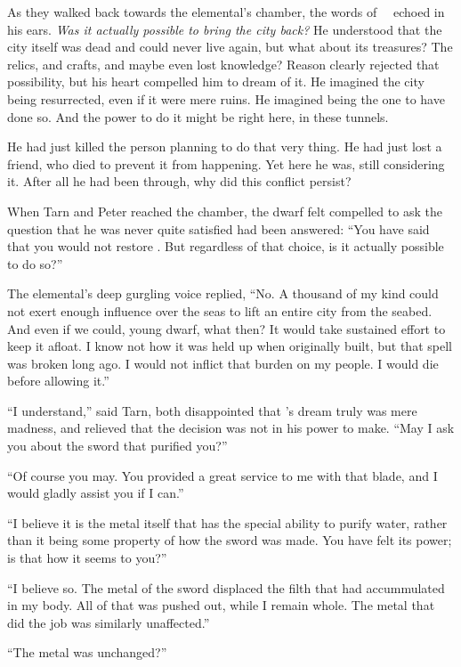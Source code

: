 As they walked back towards the elemental's chamber, the words of \mothzam\ \driktur\ echoed in his ears.  \emph{Was it actually possible to bring the city back?}  He understood that the city itself was dead and could never live again, but what about its treasures?  The relics, and crafts, and maybe even lost knowledge?  Reason clearly rejected that possibility, but his heart compelled him to dream of it.  He imagined the city being resurrected, even if it were mere ruins.  He imagined being the one to have done so.  And the power to do it might be right here, in these tunnels.

He had just killed the person planning to do that very thing.  He had just lost a friend, who died to prevent it from happening.  Yet here he was, still considering it.  After all he had been through, why did this conflict persist?

When Tarn and Peter reached the chamber, the dwarf felt compelled to ask the question that he was never quite satisfied had been answered: ``You have said that you would not restore \valdunmir.  But regardless of that choice, is it actually possible to do so?''

The elemental's deep gurgling voice replied, ``No.  A thousand of my kind  could not exert enough influence over the seas to lift an entire city from the seabed.  And even if we could, young dwarf, what then?  It would take sustained effort to keep it afloat.  I know not how it was held up when originally built, but that spell was broken long ago.  I would not inflict that burden on my people.  I would die before allowing it.''

``I understand,'' said Tarn, both disappointed that \mothzam's dream truly was mere madness, and relieved that the decision was not in his power to make.  ``May I ask you about the sword that purified you?''

``Of course you may.  You provided a great service to me with that blade, and I would gladly assist you if I can.''

``I believe it is the metal itself that has the special ability to purify water, rather than it being some property of how the sword was made.  You have felt its power; is that how it seems to you?''

``I believe so.  The metal of the sword displaced the filth that had accummulated in my body.  All of that was pushed out, while I remain whole.  The metal that did the job was similarly unaffected.''

``The metal was unchanged?''

